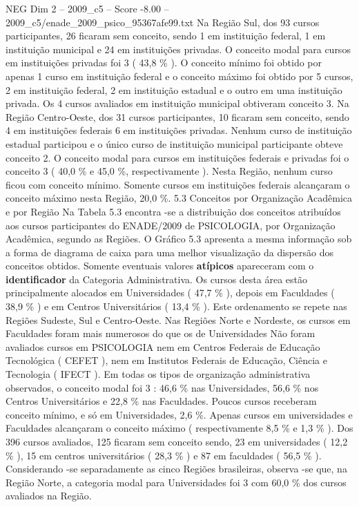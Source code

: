 \begin{textsample}{NEG Dim 2 – 2009\_c5 – Score -8.00 – 2009\_c5/enade\_2009\_psico\_95367afe99.txt}
Na Região Sul, dos 93 cursos participantes, 26 ficaram sem conceito, sendo 1 em instituição federal, 1 em instituição municipal e 24 em instituições privadas.
O conceito modal para cursos em instituições privadas foi 3 ( 43,8 \% ).
O conceito mínimo foi obtido por apenas 1 curso em instituição federal e o conceito máximo foi obtido por 5 cursos, 2 em instituição federal, 2 em instituição estadual e o outro em uma instituição privada.
Os 4 cursos avaliados em instituição municipal obtiveram conceito 3.
Na Região Centro-Oeste, dos 31 cursos participantes, 10 ficaram sem conceito, sendo 4 em instituições federais 6 em instituições privadas.
Nenhum curso de instituição estadual participou e o único curso de instituição municipal participante obteve conceito 2.
O conceito modal para cursos em instituições federais e privadas foi o conceito 3 ( 40,0 \% e 45,0 \%, respectivamente ).
Nesta Região, nenhum curso ficou com conceito mínimo.
Somente cursos em instituições federais alcançaram o conceito máximo nesta Região, 20,0 \%. 5.3 Conceitos por Organização Acadêmica e por Região Na Tabela 5.3 encontra -se a distribuição dos conceitos atribuídos aos cursos participantes do ENADE/2009 de PSICOLOGIA, por Organização Acadêmica, segundo as Regiões.
O Gráfico 5.3 apresenta a mesma informação sob a forma de diagrama de caixa para uma melhor visualização da dispersão dos conceitos obtidos.
Somente eventuais valores \textbf{atípicos} apareceram com o \textbf{identificador} da Categoria Administrativa.
Os cursos desta área estão principalmente alocados em Universidades ( 47,7 \% ), depois em Faculdades ( 38,9 \% ) e em Centros Universitários ( 13,4 \% ).
Este ordenamento se repete nas Regiões Sudeste, Sul e Centro-Oeste.
Nas Regiões Norte e Nordeste, os cursos em Faculdades foram mais numerosos do que os de Universidades Não foram avaliados cursos em PSICOLOGIA nem em Centros Federais de Educação Tecnológica ( CEFET ), nem em Institutos Federais de Educação, Ciência e Tecnologia ( IFECT ).
Em todas os tipos de organização administrativa observados, o conceito modal foi 3 : 46,6 \% nas Universidades, 56,6 \% nos Centros Universitários e 22,8 \% nas Faculdades.
Poucos cursos receberam conceito mínimo, e só em Universidades, 2,6 \%.
Apenas cursos em universidades e Faculdades alcançaram o conceito máximo ( respectivamente 8,5 \% e 1,3 \% ).
Dos 396 cursos avaliados, 125 ficaram sem conceito sendo, 23 em universidades ( 12,2 \% ), 15 em centros universitários ( 28,3 \% ) e 87 em faculdades ( 56,5 \% ).
Considerando -se separadamente as cinco Regiões brasileiras, observa -se que, na Região Norte, a categoria modal para Universidades foi 3 com 60,0 \% dos cursos avaliados na Região.

\end{textsample}

